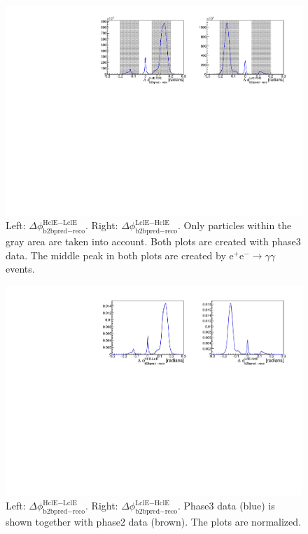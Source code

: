 \documentclass[a4paper,11pt,twosided,final,german,openbib,pdftex,listof=totoc,bibliography=totoc]{scrbook}
\begin{document}
\begin{appendix}
\begin{figure}[h!]
	\centering
	\includegraphics[width=\textwidth]{Plots/master3/hb2b_DataP3.pdf}
	\caption[b2bClusterPhi - clusterPhi For Phase3 Data]{Left: $\Delta \phi _{\textrm{b2bpred} - \textrm{reco}}^{\textrm{HclE}-\textrm{LclE}}$. Right:  $\Delta \phi _{\textrm{b2bpred} - \textrm{reco}}^{\textrm{LclE}-\textrm{HclE}}$. Only particles within the gray area are taken into account. Both plots are created with phase3 data. The middle peak in both plots are created by $\textrm{e}^+\textrm{e}^- \rightarrow \gamma \gamma$ events.}
	\label{fig:b2bData3}
\end{figure}





\begin{figure}[h!]
	\centering
	\includegraphics[width=\textwidth]{Plots/comp/cb2b.pdf}
	\caption[Normalized b2bClusterPhi - clusterPhi For Phase3 Data And Phase3 Data]{Left: $\Delta \phi _{\textrm{b2bpred} - \textrm{reco}}^{\textrm{HclE}-\textrm{LclE}}$. Right:  $\Delta \phi _{\textrm{b2bpred} - \textrm{reco}}^{\textrm{LclE}-\textrm{HclE}}$. Phase3 data (blue) is shown together with phase2 data (brown). The plots are  normalized.}
	\label{fig:Cb2bData}
\end{figure}






\end{appendix}
\end{document}
